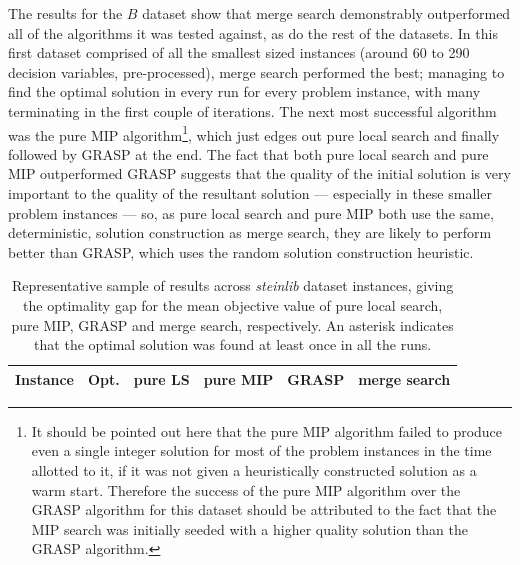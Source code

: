 \documentclass[journal]{IEEEtran}
\begin{document}
The results for the \(B\) dataset show that merge search demonstrably outperformed all of the algorithms it was tested against, as do the rest of the datasets. In this first dataset comprised of all the smallest sized instances (around 60 to 290 decision variables, pre-processed), merge search performed the best; managing to find the optimal solution in every run for every problem instance, with many terminating in the first couple of iterations. The next most successful algorithm was the pure MIP algorithm\footnote{It should be pointed out here that the pure MIP algorithm failed to produce even a single integer solution for most of the problem instances in the time allotted to it, if it was not given a heuristically constructed solution as a warm start. Therefore the success of the pure MIP algorithm over the GRASP algorithm for this dataset should be attributed to the fact that the MIP search was initially seeded with a higher quality solution than the GRASP algorithm.}, which just edges out pure local search and finally followed by GRASP at the end. The fact that both pure local search and pure MIP outperformed GRASP suggests that the quality of the initial solution is very important to the quality of the resultant solution --- especially in these smaller problem instances --- so, as pure local search and pure MIP both use the same, deterministic, solution construction as merge search, they are likely to perform better than GRASP, which uses the random solution construction heuristic.

\begin{table}[h!]
\centering
\caption{Representative sample of results across \emph{steinlib} dataset instances, giving the optimality gap for the mean objective value of pure local search, pure MIP, GRASP and merge search, respectively. An asterisk indicates that the optimal solution was found at least once in all the runs.}\label{tab:stpg:results:trunc} 
\begin{tabular}{lrrrrr} \toprule
Instance & Opt. & pure LS & pure MIP & GRASP & merge search\\ \midrule
%

%
\bottomrule
\end{tabular}
\end{table}
\end{document}
